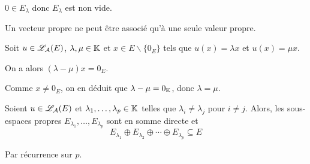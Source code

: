 \documentclass[a4paper, 12pt]{article}
\begin{document}
\begin{remarque}
    $0 \in E_\lambda$ donc $E_\lambda$ est non vide.
\end{remarque}

\begin{proposition}{}{}
    Un vecteur propre ne peut être associé qu'à une seule valeur propre.
\end{proposition}

\begin{demonstration}
    Soit $u \in \mathscr{L}_\mathcal{A}(E)$, $\lambda, \mu \in \mathbb{K}$ et $x \in E \backslash \{0_E\}$ tels que $u(x) = \lambda x$ et $u(x) = \mu x$.

    On a alors $(\lambda - \mu)x = 0_E$.

    Comme $x \neq 0_E$, on en déduit que $\lambda - \mu = 0_{\mathbb{K}}$, donc $\lambda = \mu$.
\end{demonstration}

\begin{proposition}{}{}
    Soient $u \in \mathscr{L}_\mathcal{A}(E)$ et $\lambda_1, \ldots, \lambda_p \in \mathbb{K}$ telles que $\lambda_i \neq \lambda_j$ pour $i \neq j$.
    Alors, les sous-espaces propres $E_{\lambda_1}, \ldots, E_{\lambda_p}$ sont en somme directe et
    $$
    E_{\lambda_1} \oplus E_{\lambda_2} \oplus \cdots \oplus E_{\lambda_p} \subseteq E
    $$
\end{proposition}

\begin{demonstration}
    Par récurrence sur $p$.
\end{demonstration}
\end{document}
